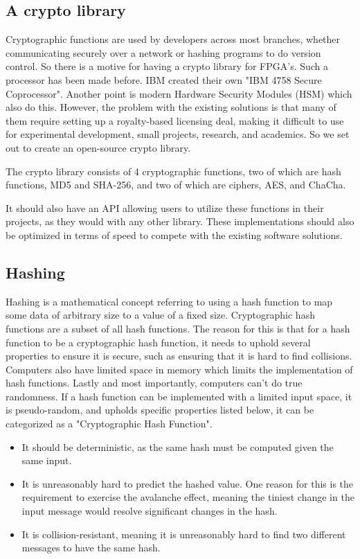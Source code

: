 \documentclass[a4paper, openany]{book}
\begin{document}
\begin{abstact}
\section{A crypto library}
\label{sec:orgbefcde1}
Cryptographic functions are used by developers across most branches, whether communicating securely over a network or hashing programs to do version control.
So there is a motive for having a crypto library for FPGA's. Such a processor has been made before. IBM created their own "IBM 4758 Secure Coprocessor"\cite{IBM4758}. Another point is modern Hardware Security Modules (HSM) which also do this.
However, the problem with the existing solutions is that many of them require setting up a royalty-based licensing deal, making it difficult to use for experimental development, small projects, research, and academics.
So we set out to create an open-source crypto library.

The crypto library consists of 4 cryptographic functions, two of which are hash functions, MD5 and SHA-256, and two of which are ciphers, AES, and ChaCha.

It should also have an API allowing users to utilize these functions in their projects, as they would with any other library.
These implementations should also be optimized in terms of speed to compete with the existing software solutions.

\subsection{Hashing}
\label{sec:org768231e}
Hashing is a mathematical concept referring to using a hash function to map some data of arbitrary size to a value of a fixed size. Cryptographic hash functions are a subset of all hash functions.
The reason for this is that for a hash function to be a cryptographic hash function, it needs to uphold several properties to ensure it is secure, such as ensuring that it is hard to find collisions. Computers also have limited space in memory which limits the implementation of hash functions. Lastly and most importantly, computers can't do true randomness.
If a hash function can be implemented with a limited input space, it is pseudo-random, and upholds specific properties listed below, it can be categorized as a "Cryptographic Hash Function".
\begin{itemize}
\item It should be deterministic, as the same hash must be computed given the same input.
\item It is unreasonably hard to predict the hashed value. One reason for this is the requirement to exercise the avalanche effect, meaning the tiniest change in the input message would resolve significant changes in the hash.
\item It is collision-resistant, meaning it is unreasonably hard to find two different messages to have the same hash.
\end{itemize}


\end{abstact}
\end{document}
